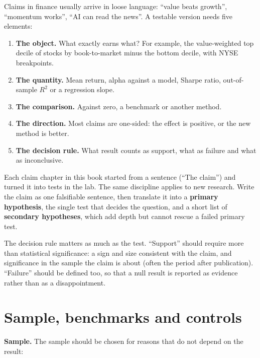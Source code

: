 Claims in finance usually arrive in loose language: ``value beats growth'', ``momentum works'', ``AI can read the news''. A testable version needs five elements:

\begin{enumerate}
  \item \textbf{The object.} What exactly earns what? For example, the value-weighted top decile of stocks by book-to-market minus the bottom decile, with NYSE breakpoints.
  \item \textbf{The quantity.} Mean return, alpha against a model, Sharpe ratio, out-of-sample $R^2$ or a regression slope.
  \item \textbf{The comparison.} Against zero, a benchmark or another method.
  \item \textbf{The direction.} Most claims are one-sided: the effect is positive, or the new method is better.
  \item \textbf{The decision rule.} What result counts as support, what as failure and what as inconclusive.
\end{enumerate}

Each claim chapter in this book started from a sentence (``The claim'') and turned it into tests in the lab. The same discipline applies to new research. Write the claim as one falsifiable sentence, then translate it into a \textbf{primary hypothesis}, the single test that decides the question, and a short list of \textbf{secondary hypotheses}, which add depth but cannot rescue a failed primary test.

The decision rule matters as much as the test. ``Support'' should require more than statistical significance: a sign and size consistent with the claim, and significance in the sample the claim is about (often the period after publication). ``Failure'' should be defined too, so that a null result is reported as evidence rather than as a disappointment.

\section{Sample, benchmarks and controls}
\label{sec:25-sample}

\textbf{Sample.} The sample should be chosen for reasons that do not depend on the result:

